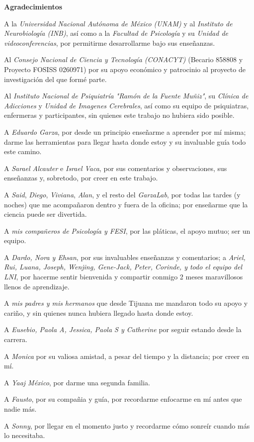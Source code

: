 \begin{center}
    \huge\textbf{Agradecimientos}
\end{center}

A la \emph{Universidad Nacional Autónoma de México (UNAM)} y al \emph{Instituto de Neurobiología (INB)}, así como a la \emph{Facultad de Psicología} y su \emph{Unidad de videoconferencias}, por permitirme desarrollarme bajo sus enseñanzas.

Al \emph{Consejo Nacional de Ciencia y Tecnología (CONACYT)} (Becario {\textnumero} 858808 y Proyecto FOSISS {\textnumero} 0260971) por su apoyo económico y patrocinio al proyecto de investigación del que formé parte.

Al \emph{Instituto Nacional de Psiquiatría "Ramón de la Fuente Muñiz"}, su \emph{Clínica de Adicciones} y \emph{Unidad de Imagenes Cerebrales}, así como su equipo de psiquiatras, enfermeras y participantes, sin quienes este trabajo no hubiera sido posible.

A \emph{Eduardo Garza}, por desde un principio enseñarme a aprender por mí misma; darme las herramientas para llegar hasta donde estoy y su invaluable guía todo este camino.

A \emph{Sarael Alcauter} e \emph{Israel Vaca}, por sus comentarios y observaciones, sus enseñanzas y, sobretodo, por creer en este trabajo.

A \emph{Said}, \emph{Diego}, \emph{Viviana}, \emph{Alan}, y el resto del \emph{GarzaLab}, por todas las tardes (y noches) que me acompañaron dentro y fuera de la oficina; por enseñarme que la ciencia puede ser divertida.

A \emph{mis compañeros de Psicología y FESI}, por las pláticas, el apoyo mutuo; ser un equipo.

A \emph{Dardo, Nora y Ehsan}, por sus invaluables enseñanzas y comentarios; a \emph{Ariel, Rui, Luana, Joseph, Wenjing, Gene-Jack, Peter, Corinde, y todo el equipo del LNI}, por hacerme sentir bienvenida y compartir conmigo 2 meses maravillosos llenos de aprendizaje.

A \emph{mis padres y mis hermanos} que desde Tijuana me mandaron todo su apoyo y cariño, y sin quienes nunca hubiera llegado hasta donde estoy.

A \emph{Eusebio, Paola A, Jessica, Paola S y Catherine} por seguir estando desde la carrera.

A \emph{Monica} por su valiosa amistad, a pesar del tiempo y la distancia; por creer en mí.

A \emph{Yaaj México}, por darme una segunda familia.

A \emph{Fausto}, por su compañia y guía, por recordarme enfocarme en mí antes que nadie más.

A \emph{Sonny}, por llegar en el momento justo y recordarme cómo sonreír cuando más lo necesitaba.\newpage
